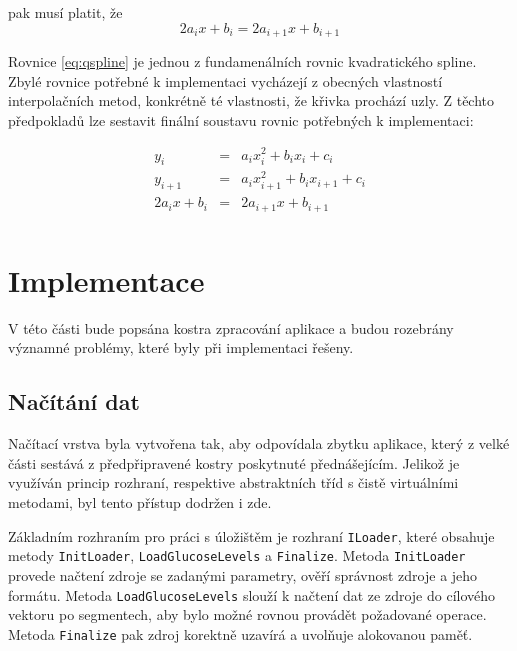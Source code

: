 \documentclass[]{thesiskiv}
\begin{document}
pak musí platit, že
\begin{equation}\label{eq:qspline}
2a_{i}x+b_{i}=2a_{i+1}x+b_{i+1}
\end{equation}

Rovnice \ref{eq:qspline} je jednou z fundamenálních rovnic kvadratického spline. Zbylé rovnice potřebné k implementaci vycházejí z obecných vlastností interpolačních metod, konkrétně té vlastnosti, že křivka prochází uzly. Z těchto předpokladů lze sestavit finální soustavu rovnic potřebných k implementaci:

\begin{equation}
\begin{array}{rcl}
 y_{i} & = & a_{i}x_{i}^2 + b_{i}x_{i} + c_{i} \\
 y_{i+1} & = & a_{i}x_{i+1}^2 + b_{i}x_{i+1} + c_{i} \\
 2a_{i}x+b_{i} & = & 2a_{i+1}x+b_{i+1} \\
\end{array}
\end{equation}




\chapter{Implementace}

V této části bude popsána kostra zpracování aplikace a budou rozebrány významné problémy, které byly při implementaci řešeny.

\section{Načítání dat}

Načítací vrstva byla vytvořena tak, aby odpovídala zbytku aplikace, který z velké části sestává z předpřipravené kostry poskytnuté přednášejícím. Jelikož je využíván princip rozhraní, respektive abstraktních tříd s čistě virtuálními metodami, byl tento přístup dodržen i zde.

Základním rozhraním pro práci s úložištěm je rozhraní \texttt{ILoader}, které obsahuje metody \texttt{InitLoader}, \texttt{LoadGlucoseLevels} a \texttt{Finalize}. Metoda \texttt{InitLoader} provede načtení zdroje se zadanými parametry, ověří správnost zdroje a jeho formátu. Metoda \texttt{LoadGlucoseLevels} slouží k načtení dat ze zdroje do cílového vektoru po segmentech, aby bylo možné rovnou provádět požadované operace. Metoda \texttt{Finalize} pak zdroj korektně uzavírá a uvolňuje alokovanou paměť.
\end{document}
